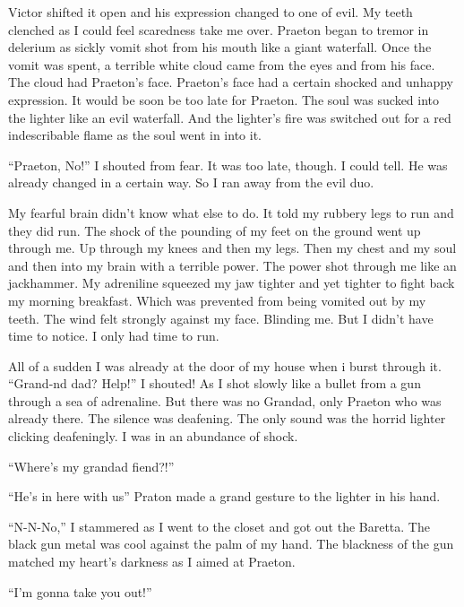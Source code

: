 Victor shifted it open and his expression changed to one of evil.
My teeth clenched as I could feel scaredness take me over. Praeton
began to tremor in delerium as sickly vomit shot from his mouth
like a giant waterfall. Once the vomit was spent, a terrible white
cloud came from the eyes and from his face. The cloud had Praeton's
face. Praeton's face had a certain shocked and unhappy expression.
It would be soon be too late for Praeton. The soul was sucked into
the lighter like an evil waterfall. And the lighter's fire was
switched out for a red indescribable flame as the soul went in into
it.



``Praeton, No!'' I shouted from fear. It was too late, though. I
could tell. He was already changed in a certain way. So I ran away
from the evil duo.



My fearful brain didn't know what else to do. It told my rubbery
legs to run and they did run. The shock of the pounding of my feet
on the ground went up through me. Up through my knees and then my
legs. Then my chest and my soul and then into my brain with a
terrible power. The power shot through me like an jackhammer. My
adreniline squeezed my jaw tighter and yet tighter to fight back my
morning breakfast. Which was prevented from being vomited out by my
teeth. The wind felt strongly against my face. Blinding me. But I
didn't have time to notice. I only had time to run.



All of a sudden I was already at the door of my house when i burst
through it. ``Grand-nd dad? Help!'' I shouted! As I shot slowly like
a bullet from a gun through a sea of adrenaline. But there was no
Grandad, only Praeton who was already there. The silence was
deafening. The only sound was the horrid lighter clicking
deafeningly. I was in an abundance of shock.



``Where's my grandad fiend?!''



``He's in here with us'' Praton made a grand gesture to the lighter
in his hand.



``N-N-No,'' I stammered as I went to the closet and got out the
Baretta. The black gun metal was cool against the palm of my hand.
The blackness of the gun matched my heart's darkness as I aimed at
Praeton.

``I'm gonna take you out!''

